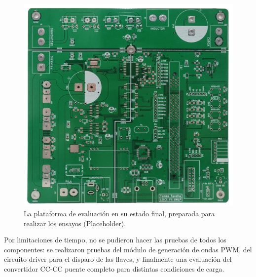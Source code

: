 \begin{figure}[h]
    \centering
    \includegraphics[scale=0.13]{Imagenes/Placa Fisica.jpg}
    \caption{La plataforma de evaluación en su estado final, preparada para realizar los ensayos {\Bold (Placeholder)}.}
    \label{plataforma_completa}
\end{figure}

Por limitaciones de tiempo, no se pudieron hacer las pruebas de todos los componentes: se realizaron pruebas del módulo de generación de ondas PWM, del circuito driver para el disparo de las llaves, y finalmente una evaluación del convertidor CC-CC puente completo para distintas condiciones de carga.\\



\afterpage{\blankpage}\newpage